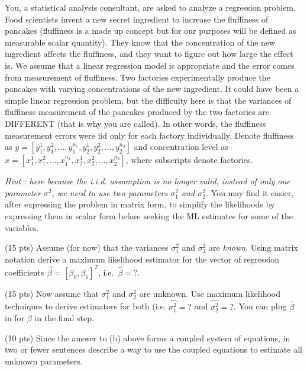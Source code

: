 \documentclass[12pt]{article}
\begin{document}
{
You, a statistical analysis consultant, are asked to analyze a regression problem. Food scientists invent a new secret ingredient to increase the fluffiness of pancakes (fluffiness is a made up concept but for our purposes will be defined as measurable scalar quantity). They know that the concentration of the new ingredient affects the fluffiness, and they want to figure out how large the effect is. We assume that a linear regression model is appropriate and the error comes from measurement of fluffiness. Two factories experimentally produce the pancakes with varying concentrations of the new ingredient. It could have been a simple linear regression problem, but the difficulty here is that the variances of fluffiness measurement of the pancakes produced by the two factories are DIFFERENT (that is why you are called). In other words, the fluffiness measurement errors were iid only for each factory individually. Denote fluffiness as $y=[y_1^1,y_1^2,\ldots,y_1^{n_1}, y_2^1,y_2^2,\ldots,y_2^{n_2}]$ and concentration level as $x=[x_1^1,x_1^2,\ldots,x_1^{n_1}, x_2^1,x_2^2,\ldots,x_2^{n_2}]$, where subscripts denote factories. 

  {\em Hint : here because the i.i.d. assumption is no longer valid, instead of only one parameter $\sigma^2$, we need to use two parameters $\sigma_1^2$ and $\sigma_2^2$.}  You may find it easier, after expressing the problem in matrix form, to simplify the likelihoods by expressing them in scalar form before seeking the ML estimates for some of the variables.



\abcs 
\item (15 pts) Assume (for now) that the variances $\sigma_1^2$ and $\sigma_2^2$ are {\em known}.   Using matrix notation derive a maximum likelihood estimator  for the vector of regression coefficients $\vec \beta = [\beta_0, \beta_1]^T$, i.e.~$\hat \beta = ?$.
\item (15 pts) Now assume that $\sigma^2_1$ and $\sigma^2_2$ are unknown.  Use maximum likelihood techniques to derive estimators for both (i.e. $\hat{\sigma_1^2} = ?$ and $\hat{\sigma_2^2} = ?$.  You can plug $\hat \beta$ in for $\beta$ in the final step.
\item (10 pts) Since the answer to (b) above forms a coupled system of equations, in two or fewer sentences describe a way to use the coupled equations to estimate all unknown parameters.
\endabcs
}
{
\vfill
\newpage
}
{
}







\problemsdone
\end{document}
